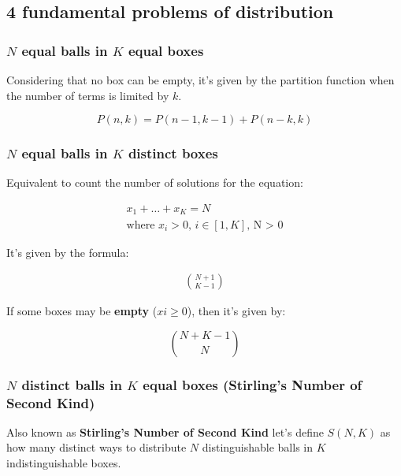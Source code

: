 \subsection{4 fundamental problems of distribution}

\subsubsection{$N$ equal balls in $K$ equal boxes}

Considering that no box can be empty, it's given by the partition function when the number of terms is limited by $k$.

\begin{equation}
  P(n,k)=P(n-1,k-1)+P(n-k,k)
\end{equation}

\subsubsection{$N$ equal balls in $K$ distinct boxes}

Equivalent to count the number of solutions for the equation: 

\begin{equation}
    \begin{array}{c}
        x_1 + \ldots + x_K = N \\
        \text{where $x_i > 0$,  $i \in \left[1,K\right]$, N > 0}
    \end{array}
\end{equation}

It's given by the formula:

\begin{equation}
    \begin{array}{c}
        \binom{N+1}{K-1}
    \end{array}
\end{equation}

If some boxes may be \textbf{empty} ($xi \geq 0$), then it's given by:

$$
    \binom{N + K - 1}{N}
$$

\subsubsection{$N$ distinct balls in $K$ equal boxes (Stirling's Number of Second Kind)}

Also known as \textbf{Stirling's Number of Second Kind} let's define $S(N,K)$ as how many distinct ways to distribute $N$ distinguishable balls in $K$ indistinguishable boxes.

